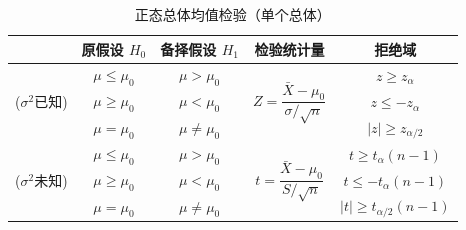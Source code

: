 \documentclass[11pt,a4paper]{report}
\theoremstyle{definition}
\begin{document}
\begin{table}[htbp]
\centering
\caption{正态总体均值检验（单个总体）}
\begin{tabular}{@{}ccccc@{}}
\toprule
& \textbf{原假设 $H_{0}$} & \textbf{备择假设 $H_{1}$} & \textbf{检验统计量} & \textbf{拒绝域} \\
\midrule
\multirow{3}{*}{($\sigma^{2}$已知)} & $\mu\leq\mu_{0}$ & $\mu>\mu_{0}$ & \multirow{3}{*}{$Z=\dfrac{\bar{X}-\mu_{0}}{\sigma/\sqrt{n}}$} & $z\geq z_{\alpha}$ \\
& $\mu\geq\mu_{0}$ & $\mu<\mu_{0}$ & & $z\leq -z_{\alpha}$ \\
& $\mu=\mu_{0}$ & $\mu\neq\mu_{0}$ & & $|z|\geq z_{\alpha/2}$ \\
\midrule
\multirow{3}{*}{($\sigma^{2}$未知)} & $\mu\leq\mu_{0}$ & $\mu>\mu_{0}$ & \multirow{3}{*}{$t=\dfrac{\bar{X}-\mu_{0}}{S/\sqrt{n}}$} & $t\geq t_{\alpha}(n-1)$ \\
& $\mu\geq\mu_{0}$ & $\mu<\mu_{0}$ & & $t\leq -t_{\alpha}(n-1)$ \\
& $\mu=\mu_{0}$ & $\mu\neq\mu_{0}$ & & $|t|\geq t_{\alpha/2}(n-1)$ \\
\bottomrule
\end{tabular}
\end{table}
\end{document}
